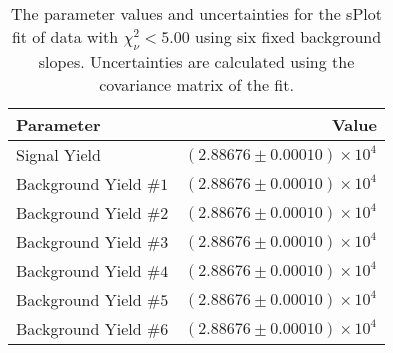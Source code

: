 
\begin{table}[ht]
    \begin{center}
        \begin{tabular}{lr}\toprule
            Parameter & Value \\\midrule
            Signal Yield & $(2.88676 \pm 0.00010) \times 10^{4}$ \\
            Background Yield $\#1$ & $(2.88676 \pm 0.00010) \times 10^{4}$ \\
            Background Yield $\#2$ & $(2.88676 \pm 0.00010) \times 10^{4}$ \\
            Background Yield $\#3$ & $(2.88676 \pm 0.00010) \times 10^{4}$ \\
            Background Yield $\#4$ & $(2.88676 \pm 0.00010) \times 10^{4}$ \\
            Background Yield $\#5$ & $(2.88676 \pm 0.00010) \times 10^{4}$ \\
            Background Yield $\#6$ & $(2.88676 \pm 0.00010) \times 10^{4}$ \\\bottomrule
        \end{tabular}
        \caption{The parameter values and uncertainties for the sPlot fit of data with $\chi^2_\nu < 5.00$ using six fixed background slopes. Uncertainties are calculated using the covariance matrix of the fit.}\label{tab:splot-fit-results-chisqdof-5.00-fixed-6}
    \end{center}
\end{table}
